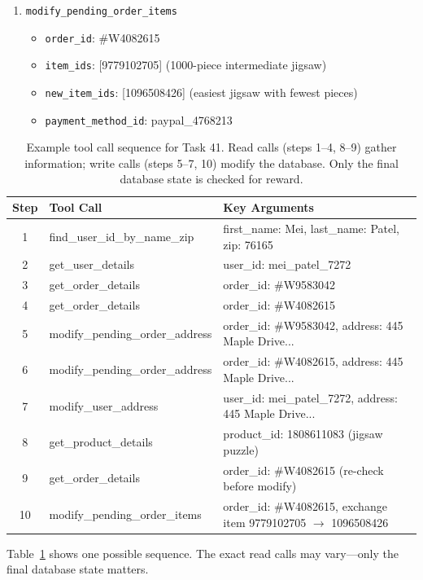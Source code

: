 \begin{enumerate}
\item \texttt{modify\_pending\_order\_items}
\begin{itemize}
\item \texttt{order\_id}: \#W4082615
\item \texttt{item\_ids}: [9779102705] (1000-piece intermediate jigsaw)
\item \texttt{new\_item\_ids}: [1096508426] (easiest jigsaw with fewest pieces)
\item \texttt{payment\_method\_id}: paypal\_4768213
\end{itemize}
\end{enumerate}

\begin{table}[h]
\centering
\small
\begin{tabular}{clp{7cm}}
\toprule
\textbf{Step} & \textbf{Tool Call} & \textbf{Key Arguments} \\
\midrule
1 & find\_user\_id\_by\_name\_zip & first\_name: Mei, last\_name: Patel, zip: 76165 \\
2 & get\_user\_details & user\_id: mei\_patel\_7272 \\
3 & get\_order\_details & order\_id: \#W9583042 \\
4 & get\_order\_details & order\_id: \#W4082615 \\
5 & modify\_pending\_order\_address & order\_id: \#W9583042, address: 445 Maple Drive... \\
6 & modify\_pending\_order\_address & order\_id: \#W4082615, address: 445 Maple Drive... \\
7 & modify\_user\_address & user\_id: mei\_patel\_7272, address: 445 Maple Drive... \\
8 & get\_product\_details & product\_id: 1808611083 (jigsaw puzzle) \\
9 & get\_order\_details & order\_id: \#W4082615 (re-check before modify) \\
10 & modify\_pending\_order\_items & order\_id: \#W4082615, exchange item 9779102705 $\rightarrow$ 1096508426 \\
\bottomrule
\end{tabular}
\caption{Example tool call sequence for Task 41. Read calls (steps 1--4, 8--9) gather information; write calls (steps 5--7, 10) modify the database. Only the final database state is checked for reward.}
\label{tab:task41-eval}
\end{table}

Table~\ref{tab:task41-eval} shows one possible sequence. The exact read calls may vary---only the final database state matters.

